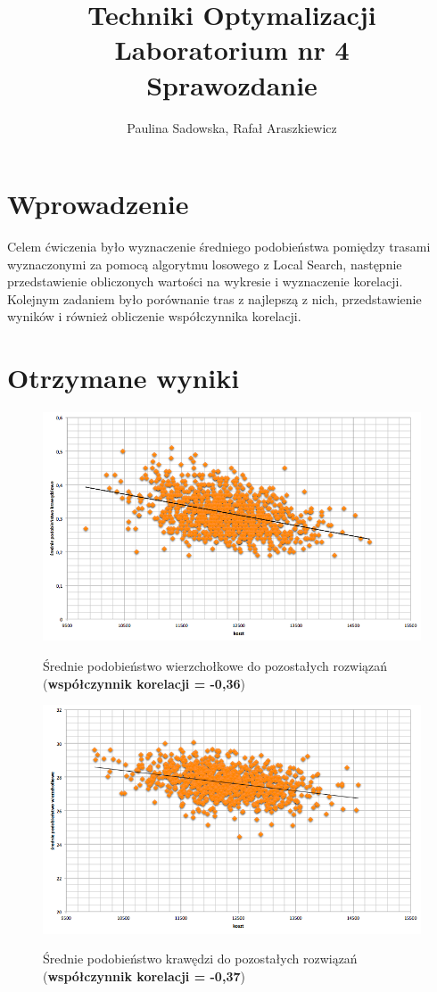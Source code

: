 \documentclass[a4paper 10pt]{article}
\title{\textbf{Techniki Optymalizacji} \\
Laboratorium nr 4 \\
Sprawozdanie}
\author{Paulina Sadowska, Rafał Araszkiewicz}
\begin{document}
\maketitle

\section{Wprowadzenie}
Celem ćwiczenia było wyznaczenie średniego podobieństwa pomiędzy trasami wyznaczonymi za pomocą algorytmu losowego z Local Search, następnie przedstawienie obliczonych wartości na wykresie i wyznaczenie korelacji. Kolejnym zadaniem było porównanie tras z najlepszą z nich, przedstawienie wyników i również obliczenie współczynnika korelacji.

\section{Otrzymane wyniki}

\begin{figure} [H]
\centering
\caption{Średnie podobieństwo wierzchołkowe do pozostałych rozwiązań (\textbf{współczynnik korelacji = -0,36})}
\includegraphics[angle=0,width = 1\textwidth, height=!]{images/edge.png}
\label{Rys. Edges}
\end{figure}

\begin{figure} [H]
\centering
\caption{Średnie podobieństwo krawędzi do pozostałych rozwiązań (\textbf{współczynnik korelacji = -0,37})}
\includegraphics[angle=0,width = 1\textwidth, height=!]{images/node.png}
\label{Rys. Node}
\end{figure}
\end{document}

